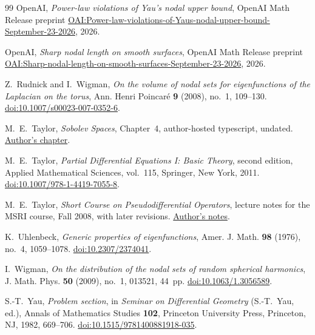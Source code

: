 \begin{thebibliography}{99}
OpenAI,
\emph{Power-law violations of Yau's nodal upper bound},
OpenAI Math Release preprint
\href{https://github.com/openai/math/blob/main/preprints/Power-law-violations-of-Yaus-nodal-upper-bound-September-23-2026/paper.pdf}{OAI:Power-law-violations-of-Yaus-nodal-upper-bound-September-23-2026},
2026.

OpenAI,
\emph{Sharp nodal length on smooth surfaces},
OpenAI Math Release preprint
\href{https://github.com/openai/math/blob/main/preprints/Sharp-nodal-length-on-smooth-surfaces-September-23-2026/paper.pdf}{OAI:Sharp-nodal-length-on-smooth-surfaces-September-23-2026},
2026.

Z.~Rudnick and I.~Wigman,
\emph{On the volume of nodal sets for eigenfunctions of the Laplacian
on the torus},
Ann. Henri Poincar\'e \textbf{9} (2008), no.~1, 109--130.
\href{https://doi.org/10.1007/s00023-007-0352-6}{doi:10.1007/s00023-007-0352-6}.

M.~E.~Taylor,
\emph{Sobolev Spaces},
Chapter~4, author-hosted typescript, undated.
\href{https://mtaylor.web.unc.edu/wp-content/uploads/sites/16915/2018/04/chap4.pdf}{Author's chapter}.

M.~E.~Taylor,
\emph{Partial Differential Equations I: Basic Theory},
second edition, Applied Mathematical Sciences, vol.~115,
Springer, New York, 2011.
\href{https://doi.org/10.1007/978-1-4419-7055-8}{doi:10.1007/978-1-4419-7055-8}.

M.~E.~Taylor,
\emph{Short Course on Pseudodifferential Operators},
lecture notes for the MSRI course, Fall 2008, with later revisions.
\href{https://mtaylor.web.unc.edu/wp-content/uploads/sites/16915/2022/05/psidolect.pdf}{Author's notes}.

K.~Uhlenbeck,
\emph{Generic properties of eigenfunctions},
Amer. J. Math. \textbf{98} (1976), no.~4, 1059--1078.
\href{https://doi.org/10.2307/2374041}{doi:10.2307/2374041}.

I.~Wigman,
\emph{On the distribution of the nodal sets of random spherical harmonics},
J. Math. Phys. \textbf{50} (2009), no.~1, 013521, 44~pp.
\href{https://doi.org/10.1063/1.3056589}{doi:10.1063/1.3056589}.

S.-T.~Yau,
\emph{Problem section},
in \emph{Seminar on Differential Geometry} (S.-T.~Yau, ed.),
Annals of Mathematics Studies \textbf{102},
Princeton University Press, Princeton, NJ, 1982, 669--706.
\href{https://doi.org/10.1515/9781400881918-035}
{doi:10.1515/9781400881918-035}.

\end{thebibliography}

